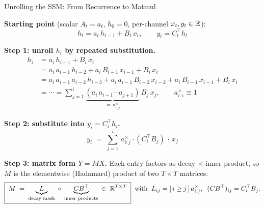 \begin{frame}{Unrolling the SSM: From Recurrence to Matmul}

  \textbf{Starting point} (scalar $A_t = a_t$, $h_0 = 0$, per-channel $x_t, y_t \in \mathbb{R}$):
  \[
    h_t = a_t\, h_{t-1} + B_t\, x_t, \qquad y_t = C_t^\top h_t
  \]

  \textbf{Step 1: unroll $h_i$ by repeated substitution.}
  \begin{align*}
    h_i &= a_i\, h_{i-1} + B_i\, x_i \\[1pt]
        &= a_i\, a_{i-1}\, h_{i-2} + a_i\, B_{i-1}\, x_{i-1} + B_i\, x_i \\[1pt]
        &= a_i\, a_{i-1}\, a_{i-2}\, h_{i-3}
            + a_i\, a_{i-1}\, B_{i-2}\, x_{i-2}
            + a_i\, B_{i-1}\, x_{i-1}
            + B_i\, x_i \\[1pt]
        &= \cdots
         = \sum_{j=1}^{i} \underbrace{(a_i\, a_{i-1} \cdots a_{j+1})}_{\displaystyle =\, a_{i:j}^\times}\, B_j\, x_j,
        \qquad a_{i:i}^\times \!\equiv\! 1
  \end{align*}

  \textbf{Step 2: substitute into $y_i = C_i^\top h_i$.}
  \[
    y_i \;=\; \sum_{j=1}^{i}\, a_{i:j}^\times \cdot (C_i^\top B_j)\, \cdot\, x_j
  \]

  \textbf{Step 3: matrix form $Y = M X$.} Each entry factors as decay $\times$ inner product, so $M$ is the elementwise (Hadamard) product of two $T{\times}T$ matrices:
  \[
    \boxed{\;M \;=\;
      \underbrace{L}_{\text{decay mask}}
      \;\circ\;
      \underbrace{CB^\top}_{\text{inner products}}
      \;\in\; \mathbb{R}^{T \times T}\;}
    \;\;\text{with}\;\;
    L_{ij} = [\,i \ge j\,]\, a_{i:j}^\times,\;\; (CB^\top)_{ij} = C_i^\top B_j.
  \]
\end{frame}

